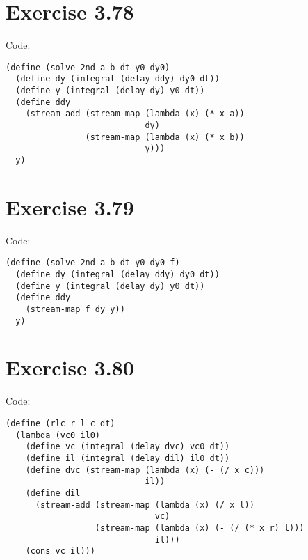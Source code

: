 \documentclass[../main.tex]{subfiles}
\begin{document}
\section{Exercise 3.78}

Code:

\begin{lstlisting}
(define (solve-2nd a b dt y0 dy0)
  (define dy (integral (delay ddy) dy0 dt))
  (define y (integral (delay dy) y0 dt))
  (define ddy
    (stream-add (stream-map (lambda (x) (* x a))
                            dy)
                (stream-map (lambda (x) (* x b))
                            y)))
  y)
\end{lstlisting}

\section{Exercise 3.79}

Code:

\begin{lstlisting}
(define (solve-2nd a b dt y0 dy0 f)
  (define dy (integral (delay ddy) dy0 dt))
  (define y (integral (delay dy) y0 dt))
  (define ddy
    (stream-map f dy y))
  y)
\end{lstlisting}

\section{Exercise 3.80}

Code:

\begin{lstlisting}
(define (rlc r l c dt)
  (lambda (vc0 il0)
    (define vc (integral (delay dvc) vc0 dt))
    (define il (integral (delay dil) il0 dt))
    (define dvc (stream-map (lambda (x) (- (/ x c)))
                            il))
    (define dil
      (stream-add (stream-map (lambda (x) (/ x l))
                              vc)
                  (stream-map (lambda (x) (- (/ (* x r) l)))
                              il)))
    (cons vc il)))
\end{lstlisting}
\end{document}

